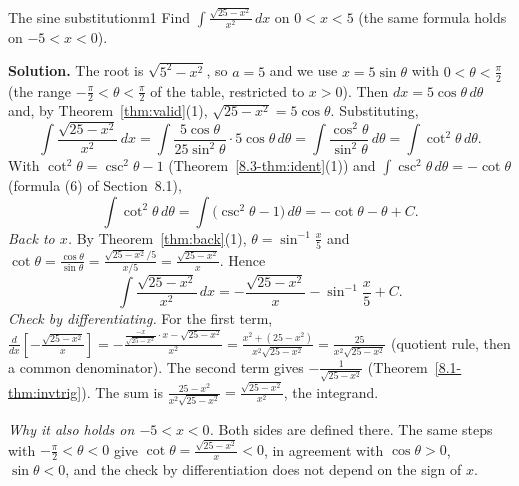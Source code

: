 \documentclass[11pt]{article}
\begin{document}
\begin{exmp}{The sine substitution}{m1}
Find $\displaystyle\int\frac{\sqrt{25-x^2}}{x^2}\,dx$ on $0<x<5$ (the same formula holds on $-5<x<0$).

\textbf{Solution.} The root is $\sqrt{5^2-x^2}$, so $a=5$ and we use $x=5\sin\theta$ with $0<\theta<\frac\pi2$ (the range $-\frac\pi2<\theta<\frac\pi2$ of the table, restricted to $x>0$). Then $dx=5\cos\theta\,d\theta$ and, by Theorem~\ref{thm:valid}(1), $\sqrt{25-x^2}=5\cos\theta$. Substituting,
\[\int\frac{\sqrt{25-x^2}}{x^2}\,dx=\int\frac{5\cos\theta}{25\sin^2\theta}\cdot5\cos\theta\,d\theta=\int\frac{\cos^2\theta}{\sin^2\theta}\,d\theta=\int\cot^2\theta\,d\theta .\]
With $\cot^2\theta=\csc^2\theta-1$ (Theorem~\ref{8.3-thm:ident}(1)) and $\int\csc^2\theta\,d\theta=-\cot\theta$ (formula (6) of Section~8.1),
\[\int\cot^2\theta\,d\theta=\int\big(\csc^2\theta-1\big)\,d\theta=-\cot\theta-\theta+C .\]
\emph{Back to $x$.} By Theorem~\ref{thm:back}(1), $\theta=\sin^{-1}\frac x5$ and $\cot\theta=\frac{\cos\theta}{\sin\theta}=\frac{\sqrt{25-x^2}/5}{x/5}=\frac{\sqrt{25-x^2}}x$. Hence
\[\int\frac{\sqrt{25-x^2}}{x^2}\,dx=-\frac{\sqrt{25-x^2}}x-\sin^{-1}\frac x5+C .\]
\emph{Check by differentiating.} For the first term, $\frac{d}{dx}\left[-\frac{\sqrt{25-x^2}}x\right]=-\frac{\frac{-x}{\sqrt{25-x^2}}\cdot x-\sqrt{25-x^2}}{x^2}=\frac{x^2+(25-x^2)}{x^2\sqrt{25-x^2}}=\frac{25}{x^2\sqrt{25-x^2}}$ (quotient rule, then a common denominator). The second term gives $-\frac1{\sqrt{25-x^2}}$ (Theorem~\ref{8.1-thm:invtrig}). The sum is $\frac{25-x^2}{x^2\sqrt{25-x^2}}=\frac{\sqrt{25-x^2}}{x^2}$, the integrand.

\emph{Why it also holds on $-5<x<0$.} Both sides are defined there. The same steps with $-\frac\pi2<\theta<0$ give $\cot\theta=\frac{\sqrt{25-x^2}}x<0$, in agreement with $\cos\theta>0$, $\sin\theta<0$, and the check by differentiation does not depend on the sign of $x$.
\end{exmp}
\end{document}
